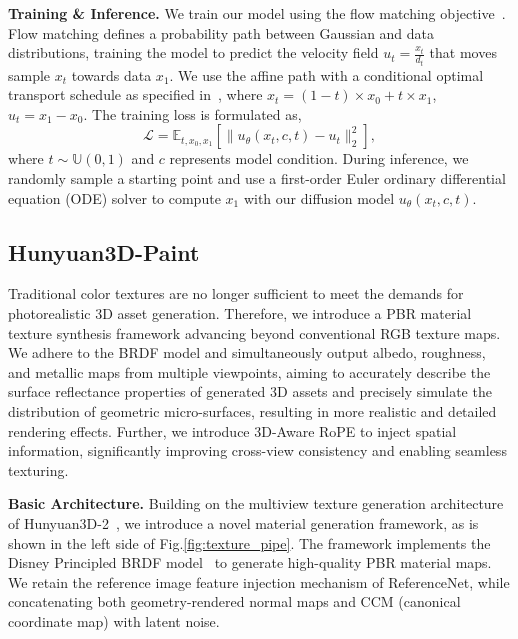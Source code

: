 \textbf{Training \& Inference.} We train our model using the flow matching objective~\cite{lipman2022flow,esser2024scaling}. Flow matching defines a probability path between Gaussian and data distributions, training the model to predict the velocity field $u_t = \frac{x_t}{d_t}$ that moves sample $x_t$ towards data $x_1$. We use the affine path with a conditional optimal transport schedule as specified in~\cite{lipman2024flowmatchingguidecode}, where $x_t = ( 1-t ) \times x_0 + t \times x_1$, $u_t = x_1 - x_0$. The training loss is formulated as,
\begin{equation}
    \mathcal{L} = \mathbb{E}_{t,x_0,x_1} [ \parallel u_\theta(x_t,c,t) - u_t \parallel_2^2 ],
\end{equation}
where $t \sim \mathbb{U}(0,1)$ and $c$ represents model condition. During inference, we randomly sample a starting point and use a first-order Euler ordinary differential equation (ODE) solver to compute $x_1$ with our diffusion model $u_\theta(x_t,c,t)$.

\subsection{Hunyuan3D-Paint}
Traditional color textures are no longer sufficient to meet the demands for photorealistic 3D asset generation. Therefore, we introduce a PBR material texture synthesis framework advancing beyond conventional RGB texture maps. We adhere to the BRDF model and simultaneously output albedo, roughness, and metallic maps from multiple viewpoints, aiming to accurately describe the surface reflectance properties of generated 3D assets and precisely simulate the distribution of geometric micro-surfaces, resulting in more realistic and detailed rendering effects. Further, we introduce 3D-Aware RoPE to inject spatial information, significantly improving cross-view consistency and enabling seamless texturing.

\textbf{Basic Architecture.} Building on the multiview texture generation architecture of Hunyuan3D-2~\cite{zhao2025hunyuan3d}, we introduce a novel material generation framework, as is shown in the left side of Fig.\ref{fig:texture_pipe}. The framework implements the Disney Principled BRDF model~\cite{burley2012physically} to generate high-quality PBR material maps.
We retain the reference image feature injection mechanism of ReferenceNet, while concatenating both geometry-rendered normal maps and CCM (canonical coordinate map) with latent noise. 

